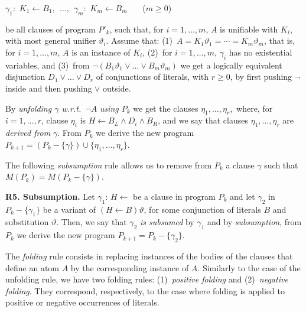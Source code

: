 \documentclass[english]{tlp}
\begin{document}
\smallskip

\( \gamma _{1}:\, \, K_{1}\leftarrow B_{1},
    \ \ \ldots,\ \
    \gamma _{m}:\, \, K_{m}\leftarrow B_{m} \) \ \ \ (\( m\geq 0 \))

\smallskip{}

\noindent be all clauses of program $P'_{k}$, such that, for \(
i=1,\ldots ,m \), \( A \) is unifiable with \( K_i \), with most
general unifier \( \vartheta _{i}\). Assume that: (1)~\(
A=K_{1}\vartheta _{1}=\cdots = K_{m}\vartheta _{m} \), that is, for
\( i=1,\ldots ,m \), \( A \) is an instance of \( K_{i}\), (2)~for
\( i=1,\ldots ,m \), \( \gamma_{i} \) has no existential variables,
and (3)~from \(\neg (B_{1}\vartheta _{1}\vee \ldots \vee
B_{m}\vartheta_{m})\) we get a logically equivalent disjunction \(
D_{1}\vee \ldots \vee D_{r} \) of conjunctions of literals, with \(
r\geq 0 \), by first pushing \( \neg \) inside and then pushing \(
\vee \) outside.

\noindent By \emph{unfolding $\gamma$  w.r.t.~$\neg A$}
 \emph{using $P_k$} we get the clauses $\eta_{1},\ldots ,
\eta_{r},$ where, for $ i\!=\!1,\ldots,r$, clause $\eta_{i}$ is
$H\leftarrow B_L\wedge D_{i}\wedge B_R$, and we say that clauses
$\eta _{1},\ldots ,\eta _{r}$ are {\it{derived from}} $\gamma $.
From $ P_{k}$ we derive the new program $P_{k+1}=(P_{k}-\{\gamma
\})\cup \{\eta _{1},\ldots ,\eta _{r}\}$.

\medskip

\noindent The following \emph{subsumption} rule allows us to remove
from $P_{k}$ a clause $\gamma$ such that
$M(P_{k})\!=\!M(P_{k}\!-\{\gamma \})$.

\medskip

\noindent \textbf{R5. Subsumption.}\label{rule:subsumption} Let
$\gamma_1$: $H\leftarrow$ be a clause in program $P_{k}$ and let
$\gamma_2$ in $P_{k}-\{\gamma_1\}$ be a variant of $(H\leftarrow
B)\vartheta$, for some conjunction of literals $B$ and substitution
$\vartheta$. Then, we say that $\gamma_2$ {\it is subsumed} by
$\gamma_1$ and by  \emph{subsumption}, from $ P_{k}$ we derive the
new program $P_{k+1}=P_{k}-\{\gamma_2\}$.

\medskip

\noindent The \emph{folding} rule consists in replacing instances of
the bodies of the clauses that define an atom $A$ by the
corresponding instance of $A$. Similarly to the case of the
unfolding rule, we have two folding rules: (1)~\emph{positive folding}
and (2)~\emph{negative folding}. They correspond, respectively, to the
case where folding is applied to positive or negative occurrences of
literals.
\end{document}
